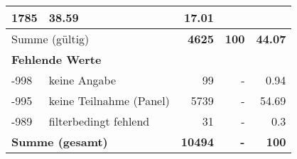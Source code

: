 \begin{longtable}{lXrrr}
       \num{1785} &
       \num[round-mode=places,round-precision=2]{38.59} &
         \num[round-mode=places,round-precision=2]{17.01} \\
     \midrule
     \multicolumn{2}{l}{Summe (gültig)} &
       \textbf{\num{4625}} &
     \textbf{\num{100}} &
       \textbf{\num[round-mode=places,round-precision=2]{44.07}} \\
     \multicolumn{5}{l}{\textbf{Fehlende Werte}}\\
       -998 &
       keine Angabe &
         \num{99} &
        - &
         \num[round-mode=places,round-precision=2]{0.94} \\
       -995 &
       keine Teilnahme (Panel) &
         \num{5739} &
        - &
         \num[round-mode=places,round-precision=2]{54.69} \\
       -989 &
       filterbedingt fehlend &
         \num{31} &
        - &
         \num[round-mode=places,round-precision=2]{0.3} \\
     \midrule
     \multicolumn{2}{l}{\textbf{Summe (gesamt)}} &
          \textbf{\num{10494}} &
        \textbf{-} &
        \textbf{\num{100}} \\
     \bottomrule
     \end{longtable}
     
